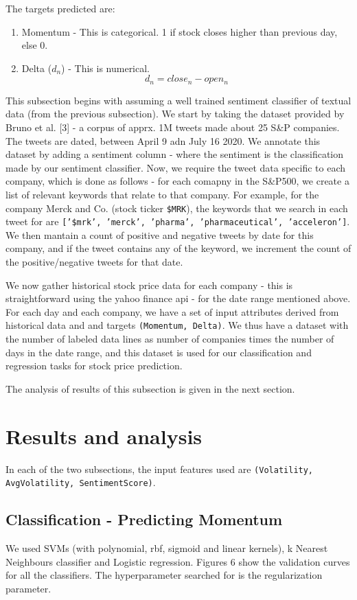\documentclass{article}
\begin{document}
The targets predicted are:
\begin{enumerate}
    \item Momentum - This is categorical. 1 if stock closes higher than previous day, else 0.
    \item Delta ($d_n$) - This is numerical. $$d_n = close_n - open_n$$
\end{enumerate}

This subsection begins with assuming a well trained sentiment classifier of textual data (from the previous subsection). We start by taking the dataset provided by Bruno et al. [3] - a corpus of apprx. 1M tweets made about 25 S\&P companies. The tweets are dated, between April 9 adn July 16 2020. We annotate this dataset by adding a sentiment column - where the sentiment is the classification made by our sentiment classifier. Now, we require the tweet data specific to each company, which is done as follows - for each comapny in the S\&P500, we create a list of relevant keywords that relate to that company. For example, for the company Merck and Co. (stock ticker \texttt{\$MRK}), the keywords that we search in each tweet for are \texttt{['\$mrk', 'merck', 'pharma', 'pharmaceutical', 'acceleron']}. We then mantain a count of positive and negative tweets by date for this company, and if the tweet contains any of the keyword, we increment the count of the positive/negative tweets for that date. 

We now gather historical stock price data for each company - this is straightforward using the yahoo finance api - for the date range mentioned above. For each day and each company, we have a set of input attributes derived from historical data and  and targets \texttt{(Momentum, Delta)}. We thus have a dataset with the number of labeled data lines as number of companies times the number of days in the date range, and this dataset is used for our classification and regression tasks for stock price prediction.

The analysis of results of this subsection is given in the next section.

\section{Results and analysis}
In each of the two subsections, the input features used are \texttt{(Volatility, AvgVolatility, SentimentScore)}. 

\subsection{Classification - Predicting Momentum}
We used SVMs (with polynomial, rbf, sigmoid and linear kernels), k Nearest Neighbours classifier and Logistic regression. Figures 6 show the validation curves for all the classifiers. The hyperparameter searched for is the regularization parameter.
\end{document}
